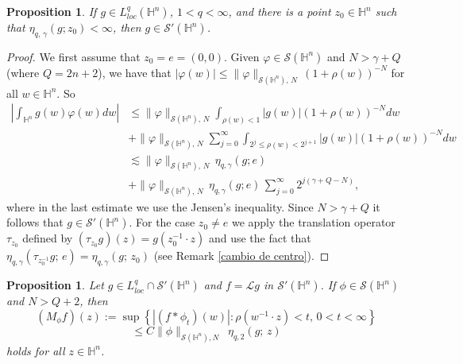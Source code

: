 \documentclass[reqno,10pt]{article}
\newtheorem{proposition}[theorem]{Proposition}
\theoremstyle{definition}
\numberwithin{equation}{section}
\numberwithin{theorem}{section}
\begin{document}
\begin{proposition} \label{g distrib}
If $g \in L^{q}_{loc}(\mathbb{H}^{n})$, $1 < q < \infty$, and there is a point $z_0 \in \mathbb{H}^{n}$ such that 
$\eta_{q, \, \gamma} (g ; z_0) < \infty$, then $g \in \mathcal{S}'(\mathbb{H}^{n})$.
\end{proposition}

\begin{proof}
We first assume that $z_0 = e = (0, 0)$. Given $\varphi \in \mathcal{S}(\mathbb{H}^{n})$ and $N > \gamma + Q$ (where $Q=2n+2$), we have 
that $|\varphi(w)| \leq \| \varphi \|_{\mathcal{S}(\mathbb{H}^{n}), \, N} \, (1 + \rho(w))^{-N}$ for all $w \in \mathbb{H}^{n}$. So
\begin{equation*}
\begin{split}
\left| \int_{\mathbb{H}^{n}} g(w) \varphi(w) dw \right| & \leq \| \varphi \|_{\mathcal{S}(\mathbb{H}^{n}), \, N} 
\int_{\rho(w) < 1} |g(w)| (1 + \rho(w))^{-N} dw \\
& + \| \varphi \|_{\mathcal{S}(\mathbb{H}^{n}), \, N} \sum_{j=0}^{\infty} \int_{2^j \leq \rho(w) < 2^{j+1}} |g(w)| 
(1+\rho(w))^{-N} dw \\
& \lesssim  \| \varphi \|_{\mathcal{S}(\mathbb{H}^{n}), \, N} \, \eta_{q, \gamma}(g; e) \\
& +  \| \varphi \|_{\mathcal{S}(\mathbb{H}^{n}), \, N} \, \eta_{q, \gamma}(g; e) \, \sum_{j=0}^{\infty} 2^{j(\gamma + Q - N)},
\end{split}
\end{equation*}
where in the last estimate we use the Jensen's inequality. Since $N > \gamma + Q$ it follows that $g \in \mathcal{S}'(\mathbb{H}^{n})$. For the case $z_0 \neq e$ we apply the translation operator $\tau_{z_0}$ defined by $(\tau_{z_0}g)(z) = g(z_{0}^{-1} \cdot z)$ and use the fact that $\eta_{q, \gamma} \left( \tau_{z_{0}^{-1}} g; \, e \right) = \eta_{q, \gamma}(g; \, z_0)$ (see Remark \ref{cambio de centro}).
\end{proof}


\begin{proposition} \label{Lg dist} Let $g \in L^q_{loc} \cap \mathcal{S}'(\mathbb{H}^n)$ and $f = \mathcal{L} g$ in 
$\mathcal{S}'(\mathbb{H}^n)$. If $\phi \in \mathcal{S}(\mathbb{H}^n)$ and $N > Q+2$, then
\[
(M_{\phi}f)(z) := \sup \left\{ |(f \ast \phi_t)(w)| : \rho(w^{-1} \cdot z) < t, \, 0 < t < \infty \right\}  
\]
\[
\leq C \| \phi \|_{\mathcal{S}(\mathbb{H}^{n}), N}  \,\,\, \eta_{q, 2}(g; \, z)
\]
holds for all $z \in \mathbb{H}^n$.
\end{proposition}
\end{document}
